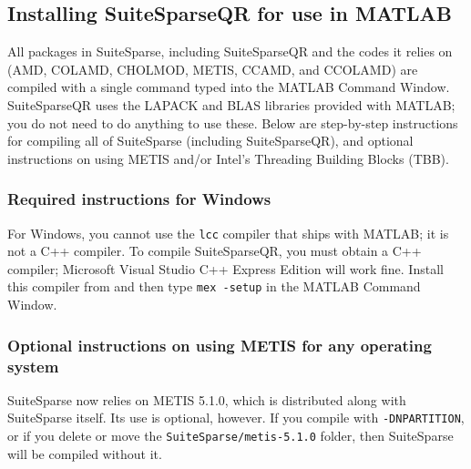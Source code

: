 \documentclass[12pt]{article}
\begin{document}
\subsection{Installing SuiteSparseQR for use in MATLAB}

All packages in SuiteSparse, including SuiteSparseQR and the codes it relies on
(AMD, COLAMD, CHOLMOD, METIS, CCAMD, and CCOLAMD) are compiled with a single
command typed into the MATLAB Command Window.  SuiteSparseQR uses the LAPACK
and BLAS libraries provided with MATLAB; you do not need to do anything to use
these.  Below are step-by-step instructions for compiling all of SuiteSparse
(including SuiteSparseQR), and optional instructions on using METIS and/or
Intel's Threading Building Blocks (TBB).

\subsubsection{Required instructions for Windows}

For Windows, you cannot use the \verb'lcc' compiler that ships with MATLAB; it
is not a C++ compiler.  To compile SuiteSparseQR, you must obtain a C++
compiler; Microsoft Visual Studio C++ Express Edition will work fine.  Install
this compiler from \newline
{}
and then type \verb'mex -setup' in the MATLAB Command Window.

\subsubsection{Optional instructions on using METIS for any operating system}

SuiteSparse now relies on METIS 5.1.0, which is distributed along with
SuiteSparse itself.  Its use is optional, however.  If you compile with
{\tt -DNPARTITION}, or if you delete or move the {\tt SuiteSparse/metis-5.1.0}
folder, then SuiteSparse will be compiled without it.
\end{document}
